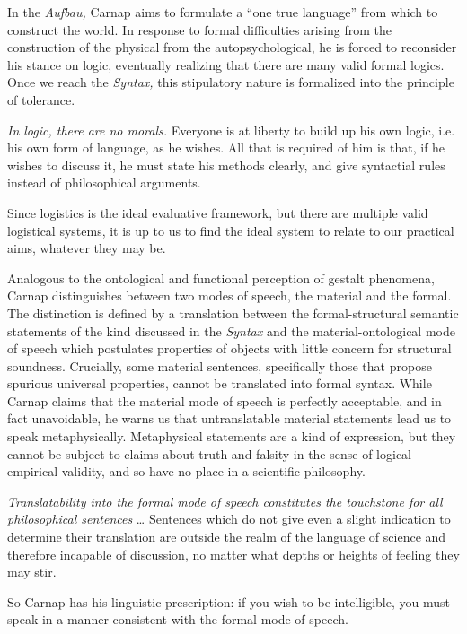 \documentclass[leqno, 12pt]{turabian-researchpaper}
\begin{document}
	In the \textit{Aufbau,} Carnap aims to formulate a \enquote{one true language}
	from which to construct the world. In response to formal difficulties arising
	from the construction of the physical from the autopsychological, he is forced
	to reconsider his stance on logic, eventually realizing that there are many
	valid formal logics. Once we reach the \textit{Syntax,} this stipulatory
	nature is formalized into the principle of tolerance.
	\begin{displayquote}
		 \emph{In logic, there are no morals.}
		Everyone is at liberty to build up his own logic, i.e. his own form of
		language, as he wishes. All that is required of him is that, if he wishes to
		discuss it, he must state his methods clearly, and give syntactial rules instead
		of philosophical arguments.
	\end{displayquote}
	Since logistics is the ideal evaluative framework, but there are multiple
	valid logistical systems, it is up to us to find the ideal system to relate to
	our practical aims, whatever they may be.

	Analogous to the ontological and functional perception of gestalt phenomena, Carnap
	distinguishes between two modes of speech, the material and the formal. The distinction
	is defined by a translation between the formal-structural semantic statements of
	the kind discussed in the \textit{Syntax} and the material-ontological mode of
	speech which postulates properties of objects with little concern for
	structural soundness. Crucially, some material sentences, specifically those that
	propose spurious universal properties, cannot be translated into formal syntax.
	While Carnap claims that the material mode of speech is perfectly acceptable,
	and in fact unavoidable, he warns us that untranslatable material statements lead
	us to speak metaphysically. Metaphysical statements are a kind of expression, but
	they cannot be subject to claims about truth and falsity in the sense of logical-empirical
	validity, and so have no place in a scientific philosophy.
	\begin{displayquote}
		 \emph{Translatability into the formal mode
		of speech constitutes the touchstone for all philosophical sentences} \dots
		Sentences which do not give even a slight indication to determine their
		translation are outside the realm of the language of science and therefore
		incapable of discussion, no matter what depths or heights of feeling they may
		stir.
	\end{displayquote}
	So Carnap has his linguistic prescription: if you wish to be intelligible, you
	must speak in a manner consistent with the formal mode of speech.
\end{document}
